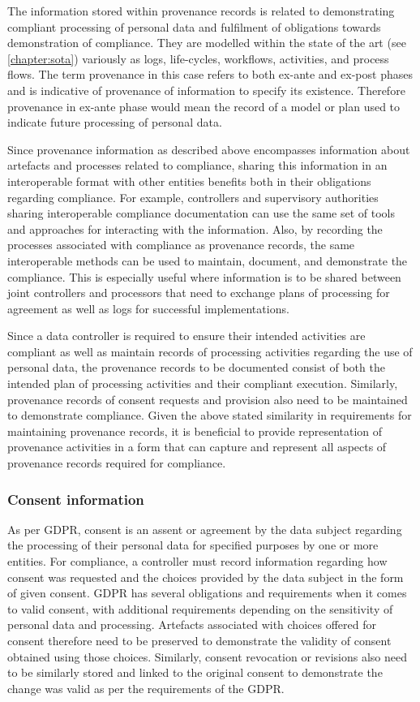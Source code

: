 The information stored within provenance records is related to demonstrating compliant processing of personal data and fulfilment of obligations towards demonstration of compliance. They are modelled within the state of the art (see \autoref{chapter:sota}) variously as logs, life-cycles, workflows, activities, and process flows. The term provenance in this case refers to both ex-ante and ex-post phases and is indicative of provenance of information to specify its existence. Therefore provenance in ex-ante phase would mean the record of a model or plan used to indicate future processing of personal data.

Since provenance information as described above encompasses information about artefacts and processes related to compliance, sharing this information in an interoperable format with other entities benefits both in their obligations regarding compliance. For example, controllers  and supervisory authorities sharing interoperable compliance documentation can use the same set of tools and approaches for interacting with the information. Also, by recording the processes associated with compliance as provenance records, the same interoperable methods can be used to maintain, document, and demonstrate the compliance. This is especially useful where information is to be shared between joint controllers and processors that need to exchange plans of processing for agreement as well as logs for successful implementations.

Since a data controller is required to ensure their intended activities are compliant as well as maintain records of processing activities regarding the use of personal data, the provenance records to be documented consist of both the intended plan of processing activities and their compliant execution. Similarly, provenance records of consent requests and provision also need to be maintained to demonstrate compliance. Given the above stated similarity in requirements for maintaining provenance records, it is beneficial to provide representation of provenance activities in a form that can capture and represent all aspects of provenance records required for compliance.

\subsubsection*{Consent information}
As per GDPR, consent is an assent or agreement by the data subject regarding the processing of their personal data for specified purposes by one or more entities. 
For compliance, a controller must record information regarding how consent was requested and the choices provided by the data subject in the form of given consent.
GDPR has several obligations and requirements when it comes to valid consent, with additional requirements depending on the sensitivity of personal data and processing. 
Artefacts associated with choices offered for consent therefore need to be preserved to demonstrate the validity of consent obtained using those choices.
Similarly, consent revocation or revisions also need to be similarly stored and linked to the original consent to demonstrate the change was valid as per the requirements of the GDPR.

